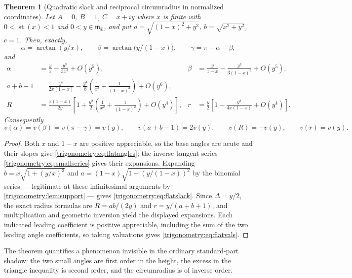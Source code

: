 \documentclass[11pt,letterpaper]{article}
\numberwithin{equation}{section}
\newtheorem{theorem}{Theorem}[section]
\theoremstyle{definition}
\theoremstyle{remark}
\newcommand{\R}{\mathbb R}
\newcommand{\mm}{\mathfrak m}
\newcommand{\st}{\operatorname{st}}
\begin{document}
\begin{theorem}[Quadratic slack and reciprocal circumradius in normalized coordinates]
\label{trigonometry:thm:flat}
Let $A=0$, $B=1$, $C=x+iy$ where $x$ is finite with $0<\st(x)<1$ and $0<y\in\mm_{\R}$, and put
$a=\sqrt{(1-x)^2+y^2}$, $b=\sqrt{x^2+y^2}$, $c=1$. Then, exactly,
\begin{equation}\label{trigonometry:eq:flatangles}
 \alpha=\arctan(y/x),\qquad \beta=\arctan\bigl(y/(1-x)\bigr),\qquad
 \gamma=\pi-\alpha-\beta,
\end{equation}
and
\begin{align}
 \alpha&=\frac yx-\frac{y^3}{3x^3}+O(y^5),&
 \beta&=\frac y{1-x}-\frac{y^3}{3(1-x)^3}+O(y^5),\\
 a+b-1&=\frac{y^2}{2x(1-x)}-\frac{y^4}8\left(\frac1{x^3}+\frac1{(1-x)^3}\right)+O(y^6),
 \label{trigonometry:eq:flatslack}\\
 R&=\frac{x(1-x)}{2y}\left[1+\frac{y^2}2\left(\frac1{x^2}+\frac1{(1-x)^2}\right)+O(y^4)\right],&
 r&=\frac y2\left[1-\frac{y^2}{4x(1-x)}+O(y^4)\right].
\end{align}
Consequently
\begin{equation}\label{trigonometry:eq:flatvals}
 v(\alpha)=v(\beta)=v(\pi-\gamma)=v(y),\qquad
 v(a+b-1)=2v(y),\qquad v(R)=-v(y),\qquad v(r)=v(y).
\end{equation}
\end{theorem}
\begin{proof}
Both $x$ and $1-x$ are positive appreciable, so the base angles are acute and their slopes give
\cref{trigonometry:eq:flatangles}; the inverse-tangent series
\cref{trigonometry:eq:smallseries} gives their expansions. Expanding
$b=x\sqrt{1+(y/x)^2}$ and $a=(1-x)\sqrt{1+(y/(1-x))^2}$ by the binomial series --- legitimate at
these infinitesimal arguments by \cref{trigonometry:lem:support} --- gives
\cref{trigonometry:eq:flatslack}. Since $\Delta=y/2$, the exact radius formulas are $R=ab/(2y)$ and
$r=y/(a+b+1)$, and multiplication and geometric inversion yield the displayed expansions. Each
indicated leading coefficient is positive appreciable, including the sum of the two leading angle
coefficients, so taking valuations gives \cref{trigonometry:eq:flatvals}.
\end{proof}
The theorem quantifies a phenomenon invisible in the ordinary standard-part shadow: the two small
angles are first order in the height, the excess in the triangle inequality is second order, and
the circumradius is of inverse order.
\end{document}

